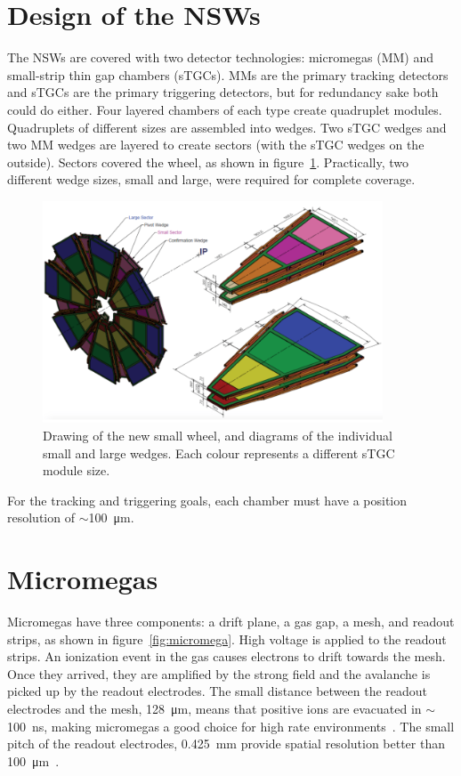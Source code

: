 \section{Design of the NSWs}

The NSWs are covered with two detector technologies: micromegas (MM) and small-strip thin gap chambers (sTGCs). MMs are the primary tracking detectors and sTGCs are the primary triggering detectors, but for redundancy sake both could do either. Four layered chambers of each type create quadruplet modules. Quadruplets of different sizes are assembled into wedges. Two sTGC wedges and two MM wedges are layered to create sectors (with the sTGC wedges on the outside). Sectors covered the wheel, as shown in figure~\ref{fig:nsw_diagram}. Practically, two different wedge sizes, small and large, were required for complete coverage.

\begin{figure}
    \centering
    \includegraphics[width = 0.9\textwidth]{figures/nsw_diagram.png}
    \caption{Drawing of the new small wheel, and diagrams of the individual small and large wedges. Each colour represents a different sTGC module size.}
    \label{fig:nsw_diagram}
\end{figure}

For the tracking and triggering goals, each chamber must have a position resolution of $\sim$\SI{100}{\micro\meter}. 

\section{Micromegas}

Micromegas have three components: a drift plane, a gas gap, a mesh, and readout strips, as shown in figure~\ref{fig:micromega}. High voltage is applied to the readout strips. An ionization event in the gas causes electrons to drift towards the mesh. Once they arrived, they are amplified by the strong field and the avalanche is picked up by the readout electrodes. The small distance between the readout electrodes and the mesh, \SI{128}{\micro\meter}, means that positive ions are evacuated in $\sim$\SI{100}{\nano\second}, making micromegas a good choice for high rate environments~\cite{nsw_tdr}. The small pitch of the readout electrodes, \SI{0.425}{mm} provide spatial resolution better than \SI{100}{\micro\meter}~\cite{stelzer_new_2016}.

